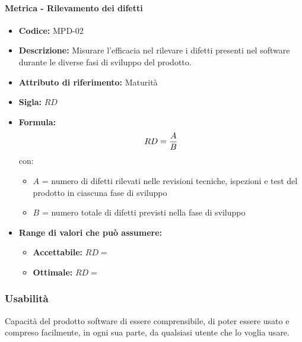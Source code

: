         \paragraph{Metrica - Rilevamento dei difetti} 
                \begin{itemize}
        \item   \textbf{Codice:} MPD-02
        \item   \textbf{Descrizione:} Misurare l'efficacia nel rilevare i difetti presenti nel software durante le diverse fasi di sviluppo del prodotto.
    \item    \textbf{Attributo di riferimento:} Maturità
    \item    \textbf{Sigla:} $RD$
    \item    \textbf{Formula:} $$RD = {A \over B}$$
            con:
            \begin{itemize}
                \item $A$ = numero di difetti rilevati nelle revisioni tecniche, ispezioni e test del prodotto in ciascuna fase di sviluppo
                \item $B$ = numero totale di difetti previsti nella fase di sviluppo
            \end{itemize}
             
             \item \textbf{Range di valori che può assumere:}
        \begin{itemize}
            \item \textbf{Accettabile:} $RD = $
            \item \textbf{Ottimale:} $RD = $
        \end{itemize}
       \end{itemize}
              
      
\subsubsection{Usabilità} 
Capacità del prodotto software di essere comprensibile, di poter essere usato e compreso facilmente, in ogni sua parte, da qualsiasi utente che lo voglia usare. \\

